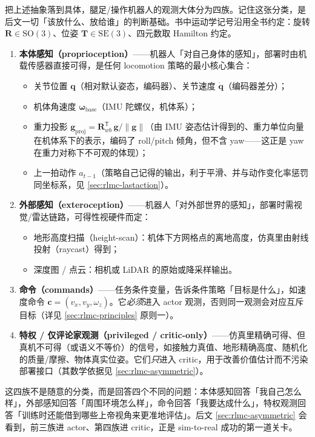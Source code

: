 把上述抽象落到具体，腿足/操作机器人的观测大体分为四族。记住这张分类，是后文一切「该放什么、放给谁」的判断基础。书中运动学记号沿用全书约定：旋转 $\mathbf R\in\mathrm{SO}(3)$、位姿 $\mathbf T\in\mathrm{SE}(3)$、四元数取 Hamilton 约定。

\begin{enumerate}
  \item \textbf{本体感知（proprioception）}——机器人「对自己身体的感知」，部署时由机载传感器直接可得，是任何 locomotion 策略的最小核心集合：
  \begin{itemize}
    \item 关节位置 $\mathbf q$（相对默认姿态，编码器）、关节速度 $\dot{\mathbf q}$（编码器差分）；
    \item 机体角速度 $\boldsymbol\omega_{\text{base}}$（IMU 陀螺仪，机体系）；
    \item 重力投影 $\mathbf g_{\text{proj}}=\mathbf R_{wb}^{\mathsf T}\,\mathbf g/\lVert\mathbf g\rVert$（由 IMU 姿态估计得到的、重力单位向量在机体系下的表示，编码了 roll/pitch 倾角，但不含 yaw——这正是 yaw 在重力对称下不可观的体现）；
    \item 上一拍动作 $a_{t-1}$（策略自己记得的输出，利于平滑、并与动作变化率惩罚同坐标系，见 \cref{sec:rlmc-lastaction}）。
  \end{itemize}
  \item \textbf{外部感知（exteroception）}——机器人「对外部世界的感知」，部署时需视觉/雷达链路，可得性视硬件而定：
  \begin{itemize}
    \item 地形高度扫描（height-scan）：机体下方网格点的离地高度，仿真里由射线投射（raycast）得到；
    \item 深度图 / 点云：相机或 LiDAR 的原始或降采样输出。
  \end{itemize}
  \item \textbf{命令（commands）}——任务条件变量，告诉条件策略「目标是什么」，如速度命令 $\mathbf c=(v_x,v_y,\omega_z)$。它\emph{必须}进入 actor 观测，否则同一观测会对应互斥目标（详见 \cref{sec:rlmc-principles} 原则一）。
  \item \textbf{特权 / 仅评论家观测（privileged / critic-only）}——仿真里精确可得、但真机不可得（或语义不等价）的信号，如接触力真值、地形精确高度、随机化的质量/摩擦、物体真实位姿。它们\emph{只}进入 critic，用于改善价值估计而不污染部署接口（其数学依据见 \cref{sec:rlmc-asymmetric}）。
\end{enumerate}

\begin{insight}[四族观测对应四个不同的问题]\label{ins:rlmc-families}
这四族不是随意的分类，而是回答四个不同的问题：本体感知回答「我自己怎么样」，外部感知回答「周围环境怎么样」，命令回答「我要达成什么」，特权观测回答「训练时还能借到哪些上帝视角来更准地评估」。后文 \cref{sec:rlmc-asymmetric} 会看到，前三族进 actor、第四族进 critic，正是 sim-to-real 成功的第一道关卡。
\end{insight}

